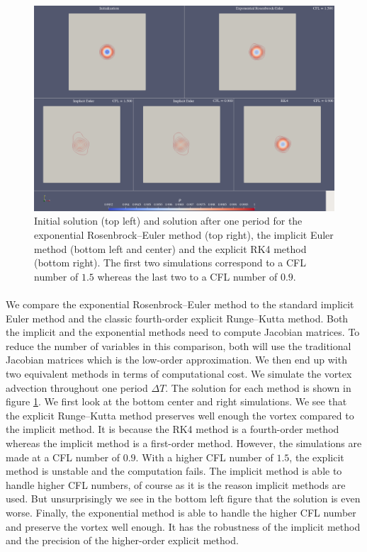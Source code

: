     \begin{figure}
      \centering
      \includegraphics[width=\textwidth]{figures/covo_cedre_fields.png}
      \caption{Initial solution (top left) and solution after one period for the exponential Rosenbrock--Euler method (top right), the implicit Euler method (bottom left and center) and the explicit RK4 method (bottom right).
      The first two simulations correspond to a CFL number of $1.5$ whereas the last two to a CFL number of $0.9$.}
      \label{fig:covo_cedre_fields}
    \end{figure}

    \paragraph{}
    We compare the exponential Rosenbrock--Euler method to the standard implicit Euler method and the classic fourth-order explicit Runge--Kutta method.
    Both the implicit and the exponential methods need to compute Jacobian matrices.
    To reduce the number of variables in this comparison, both will use the traditional Jacobian matrices which is the low-order approximation.
    We then end up with two equivalent methods in terms of computational cost.
    We simulate the vortex advection throughout one period $\Delta T$.
    The solution for each method is shown in figure \ref{fig:covo_cedre_fields}.
    We first look at the bottom center and right simulations.
    We see that the explicit Runge--Kutta method preserves well enough the vortex compared to the implicit method.
    It is because the RK4 method is a fourth-order method whereas the implicit method is a first-order method.
    However, the simulations are made at a CFL number of $0.9$.
    With a higher CFL number of $1.5$, the explicit method is unstable and the computation fails.
    The implicit method is able to handle higher CFL numbers, of course as it is the reason implicit methods are used.
    But unsurprisingly we see in the bottom left figure that the solution is even worse.
    Finally, the exponential method is able to handle the higher CFL number and preserve the vortex well enough.
    It has the robustness of the implicit method and the precision of the higher-order explicit method.

